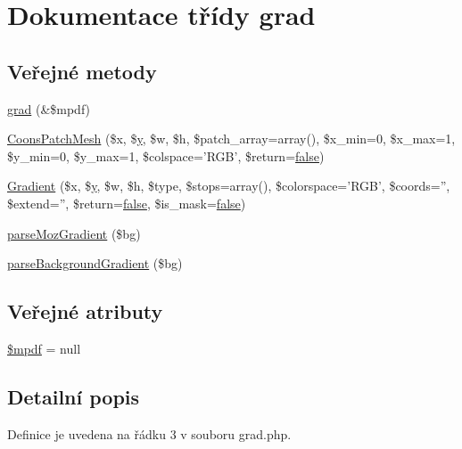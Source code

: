 \hypertarget{classgrad}{\section{Dokumentace třídy grad}
\label{classgrad}
}
\subsection*{Veřejné metody}
\begin{DoxyCompactItemize}
\item 
\hyperlink{classgrad_a2327f4882c478105269248493bd47742}{grad} (\&\$mpdf)
\item 
\hyperlink{classgrad_a79079c8e118d12fb239cc4528dd6f1f4}{Coons\-Patch\-Mesh} (\$x, \$\hyperlink{example43___m_p_d_f_i__booklet_8php_a3f83be162d14f38451e1bc419fbbbcbc}{y}, \$w, \$h, \$patch\-\_\-array=array(), \$x\-\_\-min=0, \$x\-\_\-max=1, \$y\-\_\-min=0, \$y\-\_\-max=1, \$colspace='R\-G\-B', \$return=\hyperlink{ttfontsuni_8php_afbaa04e5cc97693dc668b3c45d3dd740}{false})
\item 
\hyperlink{classgrad_a3be54ac2ef4ae1719dd9d8856386dc28}{Gradient} (\$x, \$\hyperlink{example43___m_p_d_f_i__booklet_8php_a3f83be162d14f38451e1bc419fbbbcbc}{y}, \$w, \$h, \$type, \$stops=array(), \$colorspace='R\-G\-B', \$coords='', \$extend='', \$return=\hyperlink{ttfontsuni_8php_afbaa04e5cc97693dc668b3c45d3dd740}{false}, \$is\-\_\-mask=\hyperlink{ttfontsuni_8php_afbaa04e5cc97693dc668b3c45d3dd740}{false})
\item 
\hyperlink{classgrad_ac3cbefc268604b8d0656f8b5a4fe4a22}{parse\-Moz\-Gradient} (\$bg)
\item 
\hyperlink{classgrad_a1abd79b5a368503d5ff1dcf0d65abebd}{parse\-Background\-Gradient} (\$bg)
\end{DoxyCompactItemize}
\subsection*{Veřejné atributy}
\begin{DoxyCompactItemize}
\item 
\hyperlink{classgrad_a750b339de1ba7b1a8605c4b6aa1632cd}{\$mpdf} = null
\end{DoxyCompactItemize}


\subsection{Detailní popis}


Definice je uvedena na řádku 3 v souboru grad.\-php.



